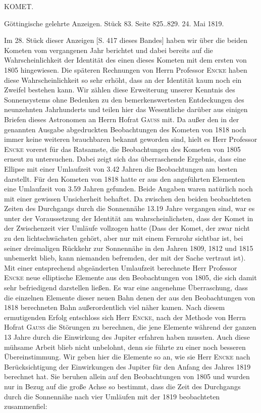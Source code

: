 \clearpage
{}
\begin{center}
\Large KOMET.

\medskip
Göttingische gelehrte Anzeigen. Stück 83. Seite 825..829. 24. Mai 1819.
\end{center}

\par\indent Im 28. Stück dieser Anzeigen [S. 417 dieses Bandes] haben wir über die beiden Kometen vom vergangenen Jahr berichtet und dabei bereits auf die Wahrscheinlichkeit der Identität des einen dieses Kometen mit dem ersten von 1805 hingewiesen. Die späteren Rechnungen von Herrn Professor \textsc{Encke} haben diese Wahrscheinlichkeit so sehr erhöht, dass an der Identität kaum noch ein Zweifel bestehen kann. Wir zählen diese Erweiterung unserer Kenntnis des Sonnensystems ohne Bedenken zu den bemerkenswertesten Entdeckungen des neunzehnten Jahrhunderts und teilen hier das Wesentliche darüber aus einigen Briefen dieses Astronomen an Herrn Hofrat \textsc{Gauss} mit. Da außer den in der genannten Ausgabe abgedruckten Beobachtungen des Kometen von 1818 noch immer keine weiteren brauchbaren bekannt geworden sind, hielt es Herr Professor \textsc{Encke} vorerst für das Ratsamste, die Beobachtungen des Kometen von 1805 erneut zu untersuchen. Dabei zeigt sich das überraschende Ergebnis, dass eine Ellipse mit einer Umlaufzeit von 3.42 Jahren die Beobachtungen am besten darstellt. Für den Kometen von 1818 hatte er aus den angeführten Elementen eine Umlaufzeit von 3.59 Jahren gefunden. Beide Angaben waren natürlich noch mit einer gewissen Unsicherheit behaftet. Da zwischen den beiden beobachteten Zeiten des Durchgangs durch die Sonnennähe 13.19 Jahre vergangen sind, war es unter der Voraussetzung der Identität am wahrscheinlichsten, dass der Komet in der Zwischenzeit vier Umläufe vollzogen hatte (Dass der Komet, der zwar nicht zu den lichtschwächsten gehört, aber nur mit einem Fernrohr sichtbar ist, bei seiner dreimaligen Rückkehr zur Sonnennähe in den Jahren 1809, 1812 und 1815 unbemerkt blieb, kann niemanden befremden, der mit der Sache vertraut ist). Mit einer entsprechend abgeänderten Umlaufzeit berechnete Herr Professor \textsc{Encke} neue elliptische Elemente aus den Beobachtungen von 1805, die sich damit sehr befriedigend darstellen ließen. Es war eine angenehme Überraschung, dass die einzelnen Elemente dieser neuen Bahn denen der aus den Beobachtungen von 1818 berechneten Bahn außerordentlich viel näher kamen. Nach diesem ermutigenden Erfolg entschloss sich Herr \textsc{Encke}, nach der Methode von Herrn Hofrat \textsc{Gauss} die Störungen zu berechnen, die jene Elemente während der ganzen 13 Jahre durch die Einwirkung des Jupiter erfahren haben mussten. Auch diese mühsame Arbeit blieb nicht unbelohnt, denn sie führte zu einer noch besseren Übereinstimmung. Wir geben hier die Elemente so an, wie sie Herr \textsc{Encke} nach Berücksichtigung der Einwirkungen des Jupiter für den Anfang des Jahres 1819 berechnet hat. Sie beruhen allein auf den Beobachtungen von 1805 und wurden nur in Bezug auf die große Achse so bestimmt, dass die Zeit des Durchgangs durch die Sonnennähe nach vier Umläufen mit der 1819 beobachteten zusammenfiel:

